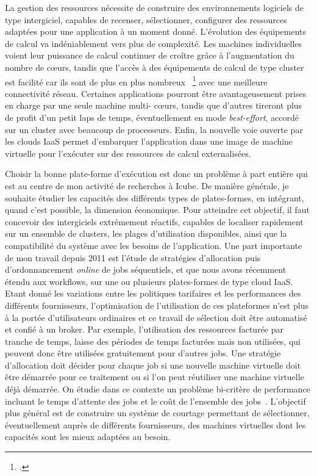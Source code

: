 \documentclass[11pt]{article}
\begin{document}
La gestion des  ressources nécessite de construire  des environnements logiciels
de  type  intergiciel,  capables   de  recenser,  sélectionner,  configurer  des
ressources  adaptées pour  une application  à un  moment donné.  L'évolution des
équipements de calcul  va indéniablement vers plus de  complexité.  Les machines
individuelles  voient leur  puissance de  calcul  continuer de  croître grâce  à
l'augmentation du nombre  de c{\oe}urs, tandis que l'accès à  des équipements de
calcul de  type cluster  est facilité car  ils sont de  plus en  plus nombreux~%
\footcite{Wu09} avec une meilleure  connectivité réseau.  Certaines applications
pourront être  avantageusement prises  en charge par  une seule  machine multi-%
c{\oe}urs, tandis que d'autres tireront plus de profit d'un petit laps de temps,
éventuellement  en  mode  \textit{best-effort},  accordé  sur  un  cluster  avec
beaucoup de  processeurs. Enfin, la  nouvelle voie  ouverte par les  clouds IaaS
permet  d'embarquer  l'application dans  une  image  de machine  virtuelle  pour
l'exécuter sur des ressources de calcul externalisées. 

Choisir la bonne plate-forme d'exécution est donc un problème à part entière qui
est au  centre de mon  activité de recherches à  Icube. De manière  générale, je
souhaite  étudier  les  capacités  des différents  types  de  plates-formes,  en
intégrant, quand  c'est possible,  la dimension  économique. Pour  atteindre cet
objectif, il faut  concevoir des intergiciels extrêmement  réactifs, capables de
localiser  rapidement sur  un  ensemble de  clusters,  les plages  d'utilisation
disponibles,  ainsi  que  la  compatibilité  du  système  avec  les  besoins  de
l'application.  Une  part importante de mon  travail depuis 2011 est  l'étude de
stratégies   d'allocation   puis   d'ordonnancement  \textit{online}   de   jobs
séquentiels,  et que  nous  avons récemment  étendu aux  workflows,  sur une  ou
plusieurs plates-formes de type cloud IaaS. Etant donné les variations entre les
politiques  tarifaires   et  les   performances  des   différents  fournisseurs,
l'optimisation  de l'utilisation  de  ces  plateformes n'est  plus  à la  portée
d'utilisateurs ordinaires  et ce  travail de sélection  doit être  automatisé et
confié  à un  broker. Par  exemple,  l'utilisation des  ressources facturée  par
tranche de temps, laisse des périodes de temps facturées mais non utilisées, qui
peuvent  donc être  utilisées  gratuitement pour  d'autres  jobs. Une  stratégie
d'allocation doit décider pour chaque job si une nouvelle machine virtuelle doit
être  démarrée  pour ce  traitement  ou  si  l'on  peut réutiliser  une  machine
virtuelle déjà  démarrée. On étudie dans  ce contexte un problème  bi-critère de
performance incluant  le temps d'attente des  jobs et le coût  de l'ensemble des
jobs~\cite{icps-2011-225}.  L'objectif plus général est de construire un système
de  courtage permettant  de  sélectionner, éventuellement  auprès de  différents
fournisseurs, des machines virtuelles dont les capacités sont les mieux adaptées
au besoin.
\end{document}
